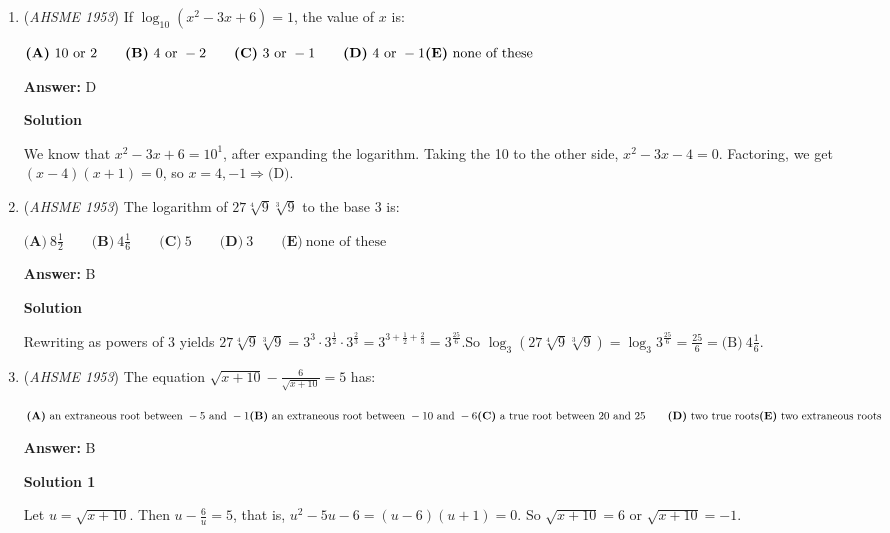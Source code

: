 \begin{enumerate}
	\item (\textit{AHSME 1953}) If $\log_{10} (x^2-3x+6)=1$, the value of $x$ is: 


 $\textbf{(A)}\ 10\text{ or }2 \qquad \textbf{(B)}\ 4\text{ or }-2 \qquad \textbf{(C)}\ 3\text{ or }-1 \qquad \textbf{(D)}\ 4\text{ or }-1\\ \textbf{(E)}\ \text{none of these}$

 \textbf{Answer: }D



\textbf{Solution}

We know that $x^2-3x+6=10^1$, after expanding the logarithm. Taking the 10 to the other side, $x^2-3x-4=0$. Factoring, we get $(x-4)(x+1)=0$, so $x=\boxed{4,-1\Rightarrow \text{(D)}}$.

 


	\item (\textit{AHSME 1953}) The logarithm of $27\sqrt[4]{9}\sqrt[3]{9}$ to the base $3$ is: 


 $\textbf{(A)}\ 8\frac{1}{2} \qquad \textbf{(B)}\ 4\frac{1}{6} \qquad \textbf{(C)}\ 5 \qquad \textbf{(D)}\ 3 \qquad \textbf{(E)}\ \text{none of these}$

 \textbf{Answer: }B



\textbf{Solution}

Rewriting as powers of $3$ yields $27\sqrt[4]{9}\sqrt[3]{9} = 3^3\cdot 3^\frac{1}{2}\cdot 3^\frac{2}{3} = 3^{3+\frac{1}{2}+\frac{2}{3}} = 3^\frac{25}{6}$.So $\log_3\left({27\sqrt[4]{9}\sqrt[3]{9}}\right) = \log_3{3^\frac{25}{6}} = \frac{25}{6} = \boxed{\text{(B)}\ 4\frac{1}{6}}$.

 


	\item (\textit{AHSME 1953}) The equation $\sqrt {x + 10} - \frac {6}{\sqrt {x + 10}} = 5$ has: 


 $\textbf{(A)}\ \text{an extraneous root between } - 5\text{ and } - 1 \\  \textbf{(B)}\ \text{an extraneous root between }-10\text{ and }-6\\ \textbf{(C)}\ \text{a true root between }20\text{ and }25\qquad \textbf{(D)}\ \text{two true roots}\\ \textbf{(E)}\ \text{two extraneous roots}$

 \textbf{Answer: }B



\textbf{Solution 1}

Let $u = \sqrt{x+10}$.  Then $u - \frac{6}{u} = 5$, that is, $u^2 - 5u - 6 = (u-6)(u+1) = 0$.  So $\sqrt{x+10} = 6$ or $\sqrt{x + 10} = -1$.  


\end{enumerate}
